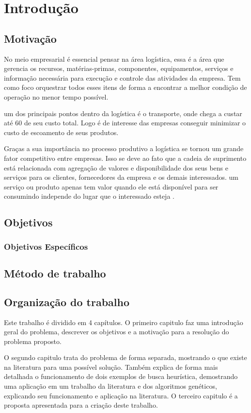 
\chapter[Introdução]{Introdução}

\section{Motivação}

No meio empresarial é essencial pensar na área logística, essa é a área que gerencia os recursos,
matérias-primas, componentes, equipamentos, serviços e informação necessária para execução e 
controle das atividades da empresa. Tem como foco orquestrar todos esses itens de forma a encontrar
a melhor condição de operação no menor tempo possível. \cite{DIAS}

um dos principais pontos dentro da logística é o transporte, onde chega a custar até 60%
de seu custo total.\cite{RODRIGUES} Logo é de interesse das empresas conseguir minimizar o custo de escoamento de seus produtos.

Graças a sua importância no processo produtivo a logística se tornou um grande fator competitivo entre empresas.
Isso se deve ao fato que a cadeia de suprimento está relacionada com agregação de valores e disponibilidade dos seus bens e
serviços para os clientes, fornecedores da empresa e os demais interessados. um serviço ou produto apenas tem valor quando 
ele está disponível para ser consumindo independe do lugar que o interessado esteja \cite{TSUDA}.

\section{Objetivos}



\subsection{Objetivos Específicos}



\section{Método de trabalho}

\section{Organização do trabalho}
Este trabalho é dividido em 4 capítulos. O primeiro capitulo faz uma introdução geral do problema, descrever os objetivos e a motivação para a resolução do problema proposto.

O segundo capitulo trata do problema de forma separada, mostrando o que existe na literatura para uma possível solução. Também explica de forma mais detalhada o funcionamento de dois exemplos de busca heurística, demostrando uma aplicação em um trabalho da literatura e dos algoritmos genéticos, explicando seu funcionamento e aplicação na literatura.
O terceiro capitulo é a proposta apresentada para a criação deste trabalho.

